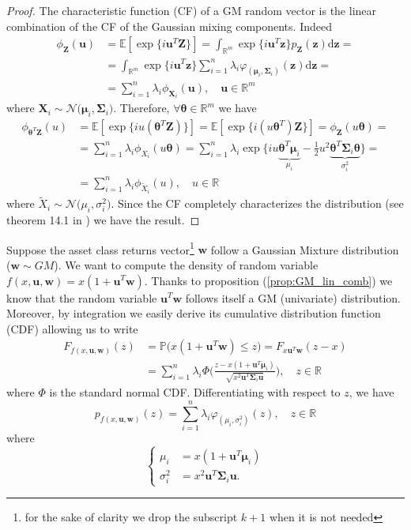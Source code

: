 \begin{proof}
	The characteristic function (CF) of a GM random vector is the linear combination of the CF of the Gaussian mixing components. Indeed 
	\begin{align*}
	\phi_{\bm{Z}}(\bm{u}) &= \mathbb{E}[\exp\{i \bm{u}^T \bm{Z}\} ] = \int_{\mathbb{R}^m}\exp\{i \bm{u}^T \bm{z}\}p_{\bm{Z}}(\bm{z})\mathrm{d}\bm{z} = \\
	& = \int_{\mathbb{R}^m}\exp\{i \bm{u}^T \bm{z}\}\sum_{i=1}^{n}\lambda_i \varphi_{(\bm{\mu}_i,\bm{\Sigma}_i)}(\bm{z})\mathrm{d}\bm{z} = \\
	& = \sum_{i=1}^{n}\lambda_i \phi_{\bm{X}_i}(\bm{u}), \quad \bm{u} \in \mathbb{R}^m
	\end{align*}
	where $\bm{X}_i \sim \mathcal{N}\big(\bm{\mu}_i,\bm{\Sigma}_i\big)$. Therefore, $\forall \bm{\theta} \in \mathbb{R}^m$ we have
	\begin{align*}
	\phi_{\bm{\theta}^T \bm{Z}}(u) & = \mathbb{E}[\exp\{iu(\bm{\theta}^T\bm{Z})\}] = \mathbb{E}[\exp\{i(u\bm{\theta}^T)\bm{Z}\}] = 
    \phi_{\bm{Z}}(u\bm{\theta}) = \\
    & = \sum_{i=1}^{n}\lambda_i \phi_{X_i}(u\bm{\theta}) = \sum_{i=1}^{n}\lambda_i \exp\{iu\underbrace{\bm{\theta}^T\bm{\mu}_i}_{\mu_i}-\frac{1}{2}u^2\underbrace{\bm{\theta}^T\bm{\Sigma}_i\bm{\theta}}_{\sigma_i^2}\} = \\
	& = \sum_{i=1}^{n}\lambda_i \phi_{\widetilde{X}_i}(u), \quad u \in \mathbb{R}
	\end{align*}
	where $\widetilde{X}_i \sim \mathcal{N}\big(\mu_i,\sigma_i^2 \big)$. Since the CF completely characterizes the distribution (see theorem 14.1 in \cite{jacod2000probability}) we have the result.
\end{proof}
Suppose the asset class returns vector\footnote{for the sake of clarity we drop the subscript $k+1$ when it is not needed} $\bm{w}$ follow a Gaussian Mixture distribution ($\bm{w} \sim GM $). We want to compute the density of random variable $f(x,\bm{u},\bm{w}) = x(1 + \bm{u}^T\bm{w})$. Thanks to proposition (\ref{prop:GM_lin_comb}) we know that the random variable $\bm{u}^T\bm{w}$ follows itself a GM (univariate) distribution. Moreover, by integration we easily derive its cumulative distribution function (CDF) allowing us to write
\begin{align*}
F_{f(x,\bm{u},\bm{w})}(z) & = \mathbb{P}\big(x(1+\bm{u}^T\bm{w})\leq z \big) = F_{x\bm{u}^T\bm{w}}(z-x)\\
& = \sum_{i=1}^{n}\lambda_i \Phi\Big(\frac{z - x(1+\bm{u}^T\bm{\mu}_i)}{\sqrt{x^2\bm{u}^T\bm{\Sigma}_i\bm{u}}}\Big), \quad z \in \mathbb{R}
\end{align*}
where $\Phi$ is the standard normal CDF. Differentiating with respect to $z$, we have
\begin{equation}
\boxed{p_{f(x,\bm{u},\bm{w})}(z) = \sum_{i=1}^{n}\lambda_i \varphi_{(\mu_i,\sigma_i^2)}(z), \quad z \in \mathbb{R}}
\end{equation}
where 
\[
\begin{cases}
	\mu_i &= x(1+\bm{u}^T \bm{\mu}_i) \\
	\sigma_i^2 & = x^2\bm{u}^T\bm{\Sigma}_i \bm{u}.
\end{cases}
\]


